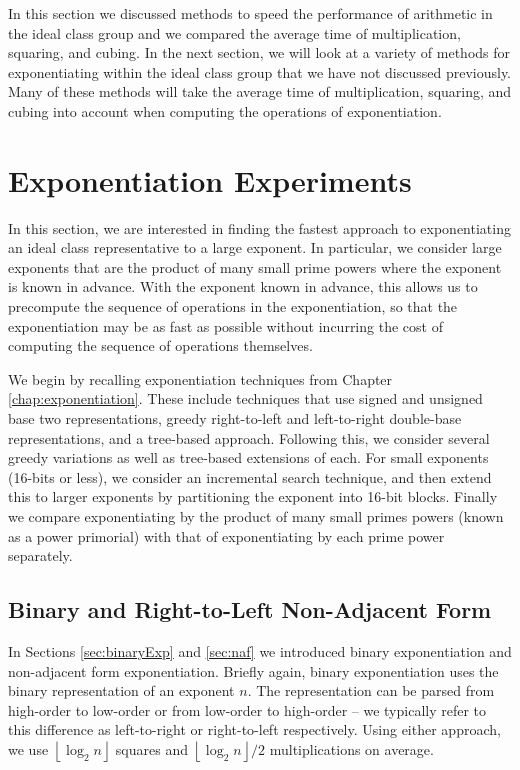 \documentclass{ucalgthes1}
\theoremstyle{definition}
\newcommand{\floor}[1]{\left\lfloor #1 \right\rfloor}
\begin{document}
In this section we discussed methods to speed the performance of arithmetic in the ideal class group and we compared the average time of multiplication, squaring, and cubing.  In the next section, we will look at a variety of methods for exponentiating within the ideal class group that we have not discussed previously.  Many of these methods will take the average time of multiplication, squaring, and cubing into account when computing the operations of exponentiation.

\bigbreak
\section{Exponentiation Experiments}
\label{sec:exponentiation}

In this section, we are interested in finding the fastest approach to exponentiating an ideal class representative to a large exponent.  In particular, we consider large exponents that are the product of many small prime powers where the exponent is known in advance.  With the exponent known in advance, this allows us to precompute the sequence of operations in the exponentiation, so that the exponentiation may be as fast as possible without incurring the cost of computing the sequence of operations themselves.

We begin by recalling exponentiation techniques from Chapter \ref{chap:exponentiation}.  These include techniques that use signed and unsigned base two representations, greedy right-to-left and left-to-right double-base representations, and a tree-based approach.  Following this, we consider several greedy variations as well as tree-based extensions of each.  For small exponents (16-bits or less), we consider an incremental search technique, and then extend this to larger exponents by partitioning the exponent into 16-bit blocks. Finally we compare exponentiating by the product of many small primes powers (known as a power primorial) with that of exponentiating by each prime power separately.

\subsection{Binary and Right-to-Left Non-Adjacent Form}

In Sections \ref{sec:binaryExp} and \ref{sec:naf} we introduced binary exponentiation and non-adjacent form exponentiation.  Briefly again, binary exponentiation uses the binary representation of an exponent $n$.  The representation can be parsed from high-order to low-order or from low-order to high-order -- we typically refer to this difference as left-to-right or right-to-left respectively.  Using either approach, we use $\floor{\log_2n}$ squares and $\floor{\log_2n}/2$ multiplications on average.
\end{document}
